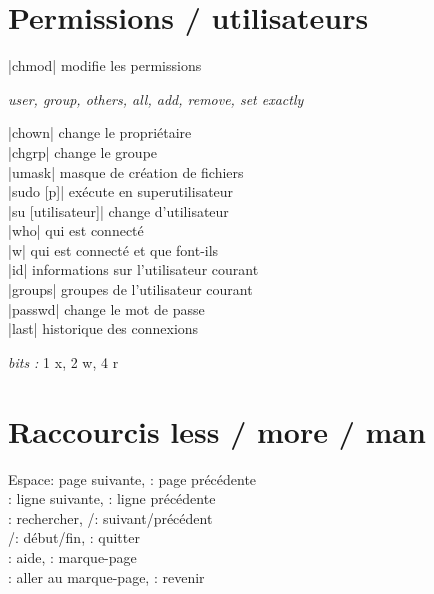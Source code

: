 \documentclass{article}
\let\oldkeys\keys
\renewcommand{\keys}[1]{\small\oldkeys{#1}\normalsize}
\newenvironment{cmdblock}{%
  \par\setlength{\parindent}{0pt}\setlength{\parskip}{0pt}%
  \RaggedRight%
}{\par}
\newlength{\cmdoptindent}
\newcommand{\cmdopt}[1]{%
  \hspace*{\cmdoptindent}%
  \begin{minipage}[t]{\dimexpr\linewidth-\cmdoptindent\relax}
    \RaggedRight \itshape #1%
  \end{minipage}\par
}
\begin{document}
\begin{multicols}{4}
    \section*{Permissions / utilisateurs}

    \begin{cmdblock}
        \code|chmod| \quad modifie les permissions \\
        \cmdopt{ user,  group,  others,  all,
            \codx{+} add, \codx{-} remove, \codx{=} set exactly}
        \code|chown| \quad change le propriétaire \\
        \code|chgrp| \quad change le groupe \\
        \code|umask| \quad masque de création de fichiers \\
        \code|sudo [p]| \quad exécute en superutilisateur \\
        \code|su [utilisateur]| \quad change d'utilisateur \\
        \code|who| \quad qui est connecté \\
        \code|w| \quad qui est connecté et que font-ils \\
        \code|id| \quad informations sur l'utilisateur courant \\
        \code|groups| \quad groupes de l'utilisateur courant \\
        \code|passwd| \quad change le mot de passe \\
        \code|last| \quad historique des connexions \\
    \end{cmdblock}

    \textit{bits :} 1 x, 2 w, 4 r

    \section*{Raccourcis less / more / man}
    \begin{cmdblock}
        Espace: page suivante, : page précédente \\
        \keys{\return}{}: ligne suivante, : ligne précédente \\
        \keys{/}: rechercher, /: suivant/précédent \\
        /: début/fin, : quitter \\
        : aide, : marque-page \\
        : aller au marque-page, : revenir \\
    \end{cmdblock}



\end{multicols}
\end{document}
